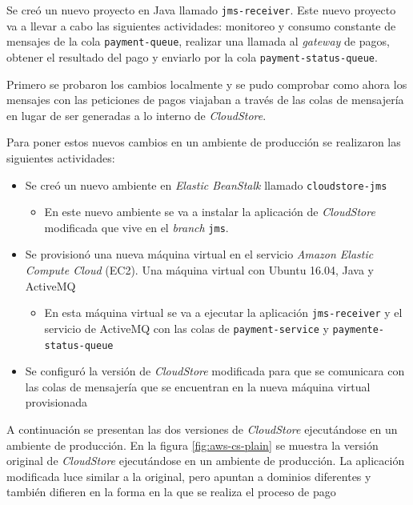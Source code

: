 \documentclass[conference]{IEEEtran}
\begin{document}
Se creó un nuevo proyecto en Java llamado \texttt{jms-receiver}. Este nuevo proyecto va a llevar a cabo las siguientes actividades: monitoreo y consumo constante de mensajes de la cola \texttt{payment-queue}, realizar una llamada al \emph{gateway} de pagos, obtener el resultado del pago y enviarlo por la cola \texttt{payment-status-queue}.

Primero se probaron los cambios localmente y se pudo comprobar como ahora los mensajes con las peticiones de pagos viajaban a través de las colas de mensajería en lugar de ser generadas a lo interno de \emph{CloudStore}.

Para poner estos nuevos cambios en un ambiente de producción se realizaron las siguientes actividades:
\begin{itemize}
    \item Se creó un nuevo ambiente en \emph{Elastic BeanStalk} llamado \texttt{cloudstore-jms}
    \begin{itemize}
        \item En este nuevo ambiente se va a instalar la aplicación de \emph{CloudStore} modificada que vive en el \emph{branch} \texttt{jms}.
    \end{itemize}

    \item Se provisionó una nueva máquina virtual en el servicio \emph{Amazon Elastic Compute Cloud} (EC2). Una máquina virtual con Ubuntu 16.04, Java y ActiveMQ
    \begin{itemize}
        \item En esta máquina virtual se va a ejecutar la aplicación \texttt{jms-receiver} y el servicio de ActiveMQ con las colas de \texttt{payment-service} y \texttt{paymente-status-queue}
    \end{itemize}
    \item Se configuró la versión de \emph{CloudStore} modificada para que se comunicara con las colas de mensajería que se encuentran en la nueva máquina virtual provisionada
\end{itemize}

A continuación se presentan las dos versiones de \emph{CloudStore} ejecutándose en un ambiente de producción. En la figura \ref{fig:aws-cs-plain} se muestra la versión original de \emph{CloudStore} ejecutándose en un ambiente de producción. La aplicación modificada luce similar a la original, pero apuntan a dominios diferentes y también difieren en la forma en la que se realiza el proceso de pago
\end{document}
